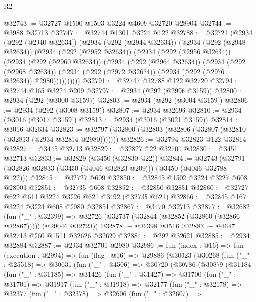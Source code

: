 \begin{lexlean}{R2}
\begin{coremodule}
@32743 := @32727 @1500 @1503 @3224 @4609 @32720 @28904
@32744 := @3988 @32713
@32747 := @32744 @1301 @3224 @122
@32788 := @32721
    (@2934
      (@292 (@2940 @32634))
      (@2934
        (@292 (@2944 @32634))
        (@2934
          (@292 (@2948 @32634))
          (@2934
            (@292 (@2952 @32634))
            (@2934
              (@292 (@2956 @32634))
              (@2934
                (@292 (@2960 @32634))
                (@2934
                  (@292 (@2964 @32634))
                  (@2934
                    (@292 (@2968 @32634))
                    (@2934 (@292 (@2972 @32634)) (@2934 (@292 (@2976 @32634)) @2980))))))))))
@32791 := @32747 @32788 @122 @32720
@32794 := @32744 @165 @3224 @209
@32797 := @2934 (@292 (@2996 @3159))
@32800 := @2934 (@292 (@3000 @3159))
@32803 := @2934 (@292 (@3004 @3159))
@32806 := @2934 (@292 (@3008 @3159))
@32807 := @2934 @32696
@32810 := @2934 (@3016 (@3017 @3159))
@32813 := @2934 (@3016 (@3021 @3159))
@32814 := @3016 @32634
@32823 := @32797 (@32800 (@32803 (@32806 (@32807 (@32810 (@32813 (@2934 @32814 @2980)))))))
@32826 := @32794 @32823 @122 @32814
@32827 := @3445 @32713
@32829 := @32827 @22 @32701
@32830 := @3451 @32713
@32833 := @32829 (@3450 (@32830 @22))
@32844 := @32743 (@32791 (@32826 @32833 (@3450 (@4046 @32823 @209))) (@3450 (@4046 @32788 @122)))
@32845 := @32727 @609
@32850 := @32845 @1502 @3224 @3227 @608 @28903
@32851 := @32735 @608
@32852 := @32850 @32851
@32860 := @32727 @622 @611 @3224 @3226 @621 @3492 (@32735 @621)
@32866 := @32845 @167 @3224 @3224 @608 @2980 @32851
@32867 := @3470 @32713
@32877 := @32682
    (fun ("_" : @32399) =>
    @32726 (@32737 (@32844 (@32852 (@32860 (@32866 @32867))))) (@29046 @32723))
@32878 := @32398 @3516
@32883 := @4647 @32713 @260 @1511 @32626 @32629
@32884 := @292 @32621
@32885 := @2934 @32884
@32887 := @2934 @32701 @2980
@32986 := fun (index : @16) =>
  fun (execution : @2994) =>
  fun (flag : @16) =>
  @29886
    (@30023
      (@30268
        (fun ("_" : @25518) =>
        @30631
          (fun ("_" : @4506) =>
          @30720
            (@30786
              (@30879
                (@31184
                  (fun ("_" : @31185) =>
                  @31426
                    (fun ("_" : @31427) =>
                    @31700
                      (fun ("_" : @31701) =>
                      @31917
                        (fun ("_" : @31918) =>
                        @32177
                          (fun ("_" : @32178) =>
                          @32377
                            (fun ("_" : @32378) =>
                            @32606
                              (fun ("_" : @32607) =>

\end{coremodule}
\end{lexlean}
